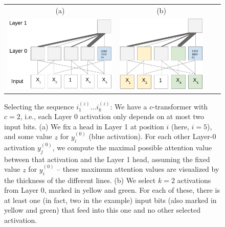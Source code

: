 \documentclass[11pt,a4paper]{article}
\begin{document}
\begin{figure}[ht]
    \centering
    \begin{tabular}{cccc}
    (a) & (b) \\
    \includegraphics[height=0.1\textheight]{figures/select-1.png} &
        \includegraphics[height=0.1\textheight]{figures/select-2.png}&
        \end{tabular}
	\caption{Selecting the sequence $i_{1}^{(z)} \dots i_{k}^{(z)}$: We have a $c$-transformer with $c=2$, i.e., each Layer 0 activation only depends on at most two input bits.
	(a)  We fix a head in Layer 1 at position $i$ (here, $i=5$), and some value $z$ for $y^{(0)}_i$ (blue activation). For each other Layer-0 activation $y^{(0)}_j$, we compute the maximal possible attention value between that activation and the Layer 1 head, assuming the fixed value $z$ for $y^{(0)}_i$ -- these maximum attention values are visualized by the thickness of the different lines.
	(b) We select $k = 2$ activations from Layer 0, marked in yellow and green. For each of these, there is at least one (in fact, two in the example) input bits (also marked in yellow and green) that feed into this one and no other selected activation.}
	\label{fig:selecting}
\end{figure}
\end{document}
